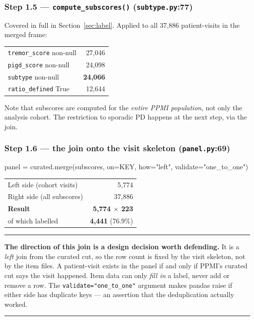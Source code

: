 \documentclass[11pt,a4paper]{article}
\newcommand{\code}[1]{\texttt{\small #1}}
\newenvironment{keypoint}
  {\begin{center}\begin{minipage}{0.95\textwidth}%
   \vspace{4pt}\hrule\vspace{7pt}\small}
  {\vspace{7pt}\hrule\vspace{4pt}\end{minipage}\end{center}}
\begin{document}
\subsubsection*{Step 1.5 --- \code{compute\_subscores()} \quad (\code{subtype.py}:77)}

Covered in full in Section~\ref{sec:label}. Applied to all 37{,}886
patient-visits in the merged frame:

\begin{table}[h]
\centering
\begin{tabular}{@{}lr@{}}
\toprule
\code{tremor\_score} non-null & 27{,}046 \\
\code{pigd\_score} non-null   & 24{,}098 \\
\code{subtype} non-null       & \textbf{24{,}066} \\
\code{ratio\_defined} True    & 12{,}644 \\
\bottomrule
\end{tabular}
\end{table}

\noindent
Note that subscores are computed for the \emph{entire PPMI population}, not
only the analysis cohort. The restriction to sporadic PD happens at the next
step, via the join.

\subsubsection*{Step 1.6 --- the join onto the visit skeleton \quad (\code{panel.py}:69)}

\begin{codeblock}
panel = curated.merge(subscores, on=KEY, how="left", validate="one_to_one")
\end{codeblock}

\begin{table}[h]
\centering
\begin{tabular}{@{}lr@{}}
\toprule
Left side (cohort visits)  & 5{,}774 \\
Right side (all subscores) & 37{,}886 \\
\textbf{Result}            & \textbf{5{,}774 $\times$ 223} \\
\midrule
\quad of which labelled    & \textbf{4{,}441} \quad (76.9\%) \\
\bottomrule
\end{tabular}
\end{table}

\begin{keypoint}
\textbf{The direction of this join is a design decision worth defending.} It is
a \emph{left} join from the curated cut, so the row count is fixed by the visit
skeleton, not by the item files. A patient-visit exists in the panel if and only
if PPMI's curated cut says the visit happened. Item data can only \emph{fill in}
a label, never add or remove a row. The \code{validate="one\_to\_one"} argument
makes pandas raise if either side has duplicate keys --- an assertion that the
deduplication actually worked.
\end{keypoint}
\end{document}
